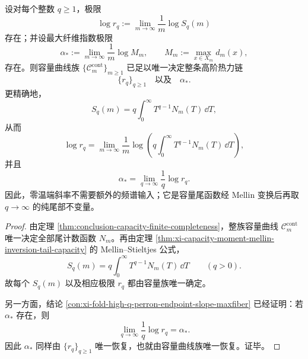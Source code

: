 \begin{theorem}[容量--矩谱--零温端斜率的完备传输]\label{thm:conclusion-capacity-moment-zero-temperature-complete-transfer}
设对每个整数 \(q\ge 1\)，极限
\[
\log r_q:=\lim_{m\to\infty}\frac{1}{m}\log S_q(m)
\]
存在；并设最大纤维指数极限
\[
\alpha_\ast:=\lim_{m\to\infty}\frac{1}{m}\log M_m,
\qquad
M_m:=\max_{x\in X_m}d_m(x),
\]
存在。则容量曲线族 \(\{\mathcal C_m^{\mathrm{cont}}\}_{m\ge 1}\) 已足以唯一决定整条高阶热力链
\[
\{r_q\}_{q\ge 1}
\quad\text{以及}\quad
\alpha_\ast.
\]
更精确地，
\[
S_q(m)=q\int_0^\infty T^{q-1}N_m(T)\,\dd T,
\]
从而
\[
\log r_q
=
\lim_{m\to\infty}
\frac{1}{m}\log\!\left(
q\int_0^\infty T^{q-1}N_m(T)\,\dd T
\right),
\]
并且
\[
\alpha_\ast=\lim_{q\to\infty}\frac{1}{q}\log r_q.
\]
因此，零温端斜率不需要额外的频谱输入；它是容量尾函数经 Mellin 变换后再取 \(q\to\infty\) 的纯尾部不变量。
\end{theorem}
\begin{proof}
由定理 \ref{thm:conclusion-capacity-finite-completeness}，整族容量曲线 \(\mathcal C_m^{\mathrm{cont}}\) 唯一决定全部尾计数函数 \(N_m\)。再由定理 \ref{thm:xi-capacity-moment-mellin-inversion-tail-capacity} 的 Mellin--Stieltjes 公式，
\[
S_q(m)=q\int_0^\infty T^{q-1}N_m(T)\,\dd T
\qquad (q>0).
\]
故每个 \(S_q(m)\) 以及相应极限 \(r_q\) 都由容量族唯一确定。

另一方面，结论 \ref{con:xi-fold-high-q-perron-endpoint-slope-maxfiber} 已经证明：若 \(\alpha_\ast\) 存在，则
\[
\lim_{q\to\infty}\frac{1}{q}\log r_q=\alpha_\ast.
\]
因此 \(\alpha_\ast\) 同样由 \(\{r_q\}_{q\ge 1}\) 唯一恢复，也就由容量曲线族唯一恢复。证毕。
\end{proof}
